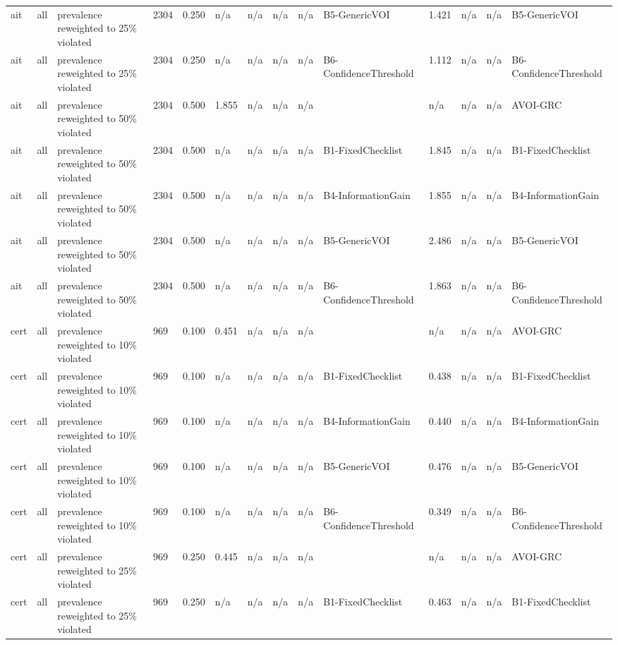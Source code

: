 \begin{table}[!ht]
{\begin{tabular}{llllllllllllll}
ait & all & prevalence reweighted to 25\% violated & 2304 & 0.250 & n/a & n/a & n/a & n/a & B5-GenericVOI & 1.421 & n/a & n/a & B5-GenericVOI \\
ait & all & prevalence reweighted to 25\% violated & 2304 & 0.250 & n/a & n/a & n/a & n/a & B6-ConfidenceThreshold & 1.112 & n/a & n/a & B6-ConfidenceThreshold \\
ait & all & prevalence reweighted to 50\% violated & 2304 & 0.500 & 1.855 & n/a & n/a & n/a &  & n/a & n/a & n/a & AVOI-GRC \\
ait & all & prevalence reweighted to 50\% violated & 2304 & 0.500 & n/a & n/a & n/a & n/a & B1-FixedChecklist & 1.845 & n/a & n/a & B1-FixedChecklist \\
ait & all & prevalence reweighted to 50\% violated & 2304 & 0.500 & n/a & n/a & n/a & n/a & B4-InformationGain & 1.855 & n/a & n/a & B4-InformationGain \\
ait & all & prevalence reweighted to 50\% violated & 2304 & 0.500 & n/a & n/a & n/a & n/a & B5-GenericVOI & 2.486 & n/a & n/a & B5-GenericVOI \\
ait & all & prevalence reweighted to 50\% violated & 2304 & 0.500 & n/a & n/a & n/a & n/a & B6-ConfidenceThreshold & 1.863 & n/a & n/a & B6-ConfidenceThreshold \\
cert & all & prevalence reweighted to 10\% violated & 969 & 0.100 & 0.451 & n/a & n/a & n/a &  & n/a & n/a & n/a & AVOI-GRC \\
cert & all & prevalence reweighted to 10\% violated & 969 & 0.100 & n/a & n/a & n/a & n/a & B1-FixedChecklist & 0.438 & n/a & n/a & B1-FixedChecklist \\
cert & all & prevalence reweighted to 10\% violated & 969 & 0.100 & n/a & n/a & n/a & n/a & B4-InformationGain & 0.440 & n/a & n/a & B4-InformationGain \\
cert & all & prevalence reweighted to 10\% violated & 969 & 0.100 & n/a & n/a & n/a & n/a & B5-GenericVOI & 0.476 & n/a & n/a & B5-GenericVOI \\
cert & all & prevalence reweighted to 10\% violated & 969 & 0.100 & n/a & n/a & n/a & n/a & B6-ConfidenceThreshold & 0.349 & n/a & n/a & B6-ConfidenceThreshold \\
cert & all & prevalence reweighted to 25\% violated & 969 & 0.250 & 0.445 & n/a & n/a & n/a &  & n/a & n/a & n/a & AVOI-GRC \\
cert & all & prevalence reweighted to 25\% violated & 969 & 0.250 & n/a & n/a & n/a & n/a & B1-FixedChecklist & 0.463 & n/a & n/a & B1-FixedChecklist \\

\end{tabular}}
\end{table}
